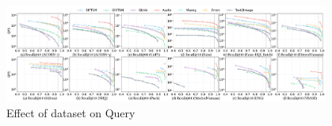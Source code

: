 \documentclass[sigconf, nonacm]{acmart}
\begin{document}
	\begin{figure}
		\centering
		\includegraphics[width=0.95\textwidth]{figures/exp/exp_6_1.pdf}
		\caption{Effect of dataset on Query}
		\label{fig:exp_6_1}
	\end{figure}
	
	
		
	
\end{document}
